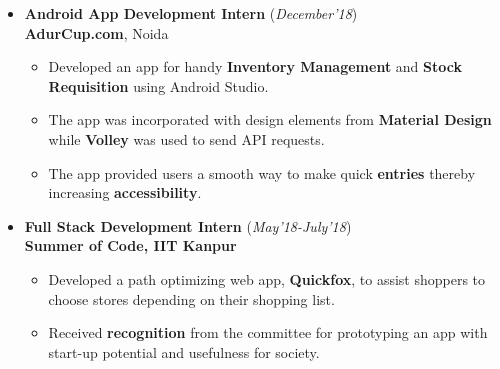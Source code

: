 \documentclass[10pt]{extarticle}
\begin{document}
\begin{itemize}
\item \textbf{Android App Development Intern} \hfill\hfill(\textit{December'18})
\\\textbf{AdurCup.com}, Noida
\begin{itemize}
\item Developed an app for handy \textbf{Inventory Management} and \textbf{Stock Requisition} using Android Studio.
\item The app was incorporated with design elements from \textbf{Material Design} while \textbf{Volley} was used to send API requests.
\item The app provided users a smooth way to make quick \textbf{entries} thereby increasing \textbf{accessibility}.
\end{itemize}
\end{itemize}

\begin{itemize}
\item \textbf{Full Stack Development Intern} \hfill\hfill(\textit{May'18-July'18})
\\\textbf{Summer of Code, IIT Kanpur}
\begin{itemize}
\item Developed a path optimizing web app, \textbf{Quickfox}, to assist shoppers to choose stores depending on their shopping list.
\item Received \textbf{recognition} from the committee for prototyping an app with start-up potential and usefulness for society.
\end{itemize}
\end{itemize}
\end{document}

